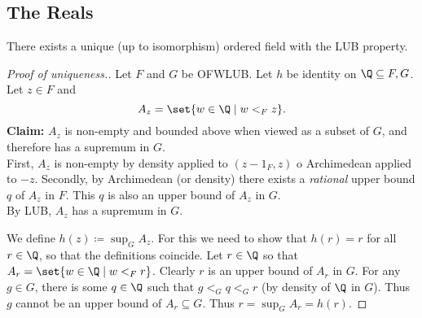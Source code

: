 \subsection{The Reals} \label{sec:R}
\vspace{0.5em}
\begin{theorem} \label{thm:R:unique}
    There exists a unique (up to isomorphism) ordered field with the LUB
    property.
\end{theorem}
\begin{proof}[Proof of uniqueness.]
    Let $F$ and $G$ be OFWLUB.
    Let $h$ be identity on $\Q \subseteq F, G$.
    Let $z \in F$ and \[
        A_z = \set{w \in \Q \mid w <_F z}.
    \]
    \textbf{Claim:} $A_z$ is non-empty and bounded above when viewed as a
    subset of $G$, and therefore has a supremum in $G$. \\
    First, $A_z$ is non-empty by density applied to $(z-1_F, z)$ o
    Archimedean applied to $-z$.
    Secondly, by Archimedean (or density) there exists a \emph{rational}
    upper bound $q$ of $A_z$ in $F$.
    This $q$ is also an upper bound of $A_z$ in $G$. \\
    By LUB, $A_z$ has a supremum in $G$.

    We define $h(z) \coloneq \sup_G A_z$.
    For this we need to show that $h(r) = r$ for all $r \in \Q$, so that the
    definitions coincide.
    Let $r \in \Q$ so that $A_r = \set{w \in \Q \mid w <_F r}$.
    Clearly $r$ is an upper bound of $A_r$ in $G$.
    For any $g \in G$, there is some $q \in \Q$ such that $g <_G q <_G r$
    (by density of $\Q$ in $G$).
    Thus $g$ cannot be an upper bound of $A_r \subseteq G$.
    Thus $r = \sup_G A_r = h(r)$.


\end{proof}

